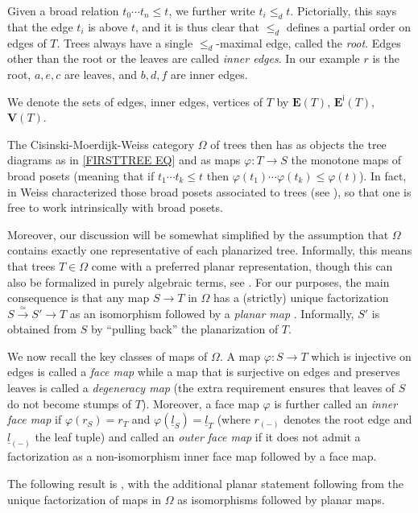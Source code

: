 \documentclass[a4paper,10pt
,draft
]{article}%
\begin{document}
Given a broad relation $t_0 \cdots t_n \leq t$,
we further write $t_i \leq_d t$.
Pictorially, this says that the edge $t_i$ is above $t$,
and it is thus clear that $\leq_d$ defines a partial order on edges of $T$.
Trees always have a single $\leq_d$-maximal edge, called the \textit{root}. Edges other than the root or the leaves are called \textit{inner edges}. In our example $r$ is the root, $a,e,c$ are leaves, and $b,d,f$ are inner edges. 

We denote the sets of edges, inner edges, vertices of $T$ by 
$\boldsymbol{E}(T)$, $\boldsymbol{E}^{\mathsf{i}}(T)$,
$\boldsymbol{V}(T)$.

The Cisinski-Moerdijk-Weiss category $\Omega$ of trees then has as objects the tree diagrams as in \eqref{FIRSTTREE EQ}
and as maps $\varphi \colon T \to S$ the monotone maps of broad posets
(meaning that if $t_1 \cdots t_k \leq t$ then
$\varphi(t_1) \cdots \varphi(t_k) \leq \varphi(t)$).
In fact, in \cite{Wei12} Weiss characterized 
those broad posets associated to trees (see \cite[Defs. 5.1 and 5.9]{Per18}),
so that one is free to work intrinsically with broad posets.

Moreover, our discussion will be somewhat simplified by the assumption that $\Omega$
contains exactly one representative of each planarized tree.
Informally, this means that trees $T \in \Omega$
come with a preferred planar representation,
though this can also be formalized in purely algebraic terms, see \cite[\S 3.1]{BP17}.
For our purposes, the main consequence is that any map 
$S \to T$ in $\Omega$ has a (strictly) unique factorization
$S \xrightarrow{\simeq} S' \to T$ as an isomorphism followed by a \textit{planar map} \cite[Prop. 3.21]{BP17}. 
Informally, $S'$ is obtained from $S$
by ``pulling back'' the planarization of $T$.

We now recall the key classes of maps of $\Omega$.
A map $\varphi \colon S \to T$ which is injective on edges is called a \textit{face map}
while a map that is surjective on edges and preserves leaves is called a \textit{degeneracy map}
(the extra requirement ensures that leaves of $S$ do not become stumps of $T$).
Moreover, a face map $\varphi$ is further called an \textit{inner face map}
if $\varphi(r_S) = r_T$ and 
$\varphi(\underline{l}_S) = \underline{l}_T$ 
(where $r_{(-)}$ denotes the root edge and $\underline{l}_{(-)}$ the leaf tuple)
and called an \textit{outer face map} if it does not admit a factorization as a non-isomorphism inner face map followed by a face map.

The following result is \cite[Cor. 3.32]{BP17}, with the additional planar statement following from the unique factorization of maps in $\Omega$ as isomorphisms followed by planar maps. 
\end{document}
